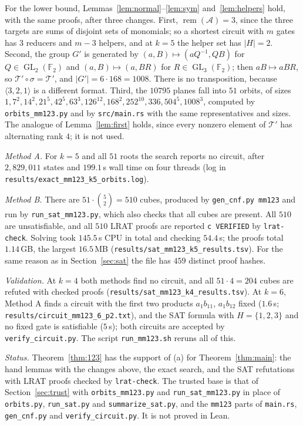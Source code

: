 \documentclass[11pt,a4paper]{article}
\theoremstyle{definition}
\newcommand{\F}{\mathbb{F}}
\newcommand{\Aff}{\mathcal{A}}
\newcommand{\Tg}{\mathcal{T}}
\newcommand{\rem}{\operatorname{rem}}
\newcommand{\GL}{\operatorname{GL}}
\newcommand{\code}[1]{\texttt{#1}}
\begin{document}
For the lower bound, Lemmas~\ref{lem:normal}--\ref{lem:sym} and~\ref{lem:helpers} hold, with the same proofs, after three changes. First, $\rem(\Aff)=3$, since the three targets are sums of disjoint sets of monomials; so a shortest circuit with $m$ gates has $3$ reducers and $m-3$ helpers, and at $k=5$ the helper set has $|H|=2$. Second, the group $G'$ is generated by $(a,B)\mapsto(aQ^{-1},QB)$ for $Q\in\GL_2(\F_2)$ and $(a,B)\mapsto(a,BR)$ for $R\in\GL_3(\F_2)$; then $aB\mapsto aBR$, so $\Tg'\circ\sigma=\Tg'$, and $|G'|=6\cdot168=1008$. There is no transposition, because $\langle3,2,1\rangle$ is a different format. Third, the $10795$ planes fall into $51$ orbits, of sizes $1,7^2,14^2,21^5,42^5,63^3,126^{12},168^2,252^{10},336,504^5,1008^3$, computed by \code{orbits\_mm123.py} and by \code{src/main.rs} with the same representatives and sizes. The analogue of Lemma~\ref{lem:first} holds, since every nonzero element of $\Tg'$ has alternating rank $4$; it is not used.

\emph{Method A.} For $k=5$ and all $51$ roots the search reports no circuit, after $2{,}829{,}011$ states and $199.1$\,s wall time on four threads (log in \code{results/exact\_mm123\_k5\_orbits.log}).

\emph{Method B.} There are $51\cdot\binom52=510$ cubes, produced by \code{gen\_cnf.py mm123} and run by \code{run\_sat\_mm123.py}, which also checks that all cubes are present. All $510$ are unsatisfiable, and all $510$ LRAT proofs are reported \code{c VERIFIED} by \code{lrat-check}. Solving took $145.5$\,s CPU in total and checking $54.4$\,s; the proofs total $1.14$\,GB, the largest $16.5$\,MB (\code{results/sat\_mm123\_k5\_results.tsv}). For the same reason as in Section~\ref{sec:sat} the file has $459$ distinct proof hashes.

\emph{Validation.} At $k=4$ both methods find no circuit, and all $51\cdot4=204$ cubes are refuted with checked proofs (\code{results/sat\_mm123\_k4\_results.tsv}). At $k=6$, Method A finds a circuit with the first two products $a_1b_{11}$, $a_1b_{12}$ fixed ($1.6$\,s; \code{results/circuit\_mm123\_6\_p2.txt}), and the SAT formula with $H=\{1,2,3\}$ and no fixed gate is satisfiable ($5$\,s); both circuits are accepted by \code{verify\_circuit.py}. The script \code{run\_mm123.sh} reruns all of this.

\emph{Status.} Theorem~\ref{thm:123} has the support of (a) for Theorem~\ref{thm:main}: the hand lemmas with the changes above, the exact search, and the SAT refutations with LRAT proofs checked by \code{lrat-check}. The trusted base is that of Section~\ref{sec:trust} with \code{orbits\_mm123.py} and \code{run\_sat\_mm123.py} in place of \code{orbits.py}, \code{run\_sat.py} and \code{summarize\_sat.py}, and the \code{mm123} parts of \code{main.rs}, \code{gen\_cnf.py} and \code{verify\_circuit.py}. It is not proved in Lean.
\end{document}
